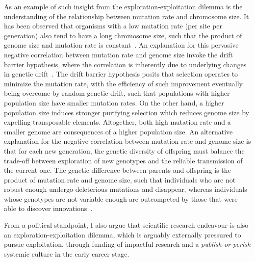 As an example of such insight from the exploration-exploitation dilemma is the understanding of the relationship between mutation rate and chromosome size.
It has been observed that organisms with a low mutation rate (per site per generation) also tend to have a long chromosome size, such that the product of genome size and mutation rate is constant~\citep{Drake1991}.
An explanation for this pervasive negative correlation between mutation rate and genome size invoke the drift barrier hypothesis, where the correlation is inherently due to underlying changes in genetic drift~\citep{Lynch2016a}.
The drift barrier hypothesis posits that selection operates to minimize the mutation rate, with the efficiency of such improvement eventually being overcome by random genetic drift, such that populations with higher population size have smaller mutation rates.
On the other hand, a higher population size induces stronger purifying selection which reduces genome size by expelling transposable elements.
Altogether, both high mutation rate and a smaller genome are consequences of a higher population size.
An alternative explanation for the negative correlation between mutation rate and genome size is that for each new generation, the genetic diversity of offspring must balance the trade-off between exploration of new genotypes and the reliable transmission of the current one.
The genetic difference between parents and offspring is the product of mutation rate and genome size, such that individuals who are not robust enough undergo deleterious mutations and disappear, whereas individuals whose genotypes are not variable enough are outcompeted by those that were able to discover innovations~\citep{Knibbe2007, Beslon2010, Hindre2012, Batut2014, Biller2016}.

From a political standpoint, I also argue that scientific research endeavour is also an exploration-exploitation dilemma, which is arguably externally pressured to pursue exploitation, through funding of impactful research and a \textit{publish-or-perish} systemic culture in the early career stage.
